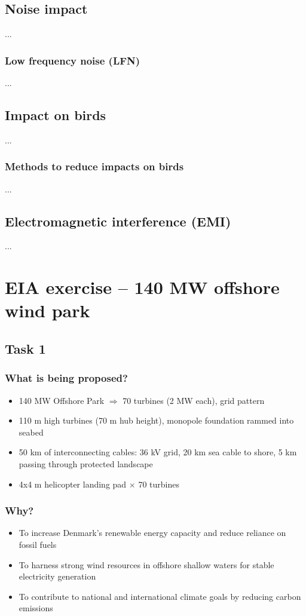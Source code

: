 \documentclass{article}
\begin{document}
\subsection{Noise impact}
...

\subsubsection{Low frequency noise (LFN)}
...

\subsection{Impact on birds}
...

\subsubsection{Methods to reduce impacts on birds}
...

\subsection{Electromagnetic interference (EMI)}
...

\newpage
\section*{EIA exercise -- 140 MW offshore wind park}

\subsection*{Task 1}
\subsubsection*{What is being proposed?}
\begin{itemize}
    \item 140 MW Offshore Park $\Rightarrow$ 70 turbines (2 MW each), grid pattern
    \item 110 m high turbines (70 m hub height), monopole foundation rammed into seabed
    \item 50 km of interconnecting cables: 36 kV grid, 20 km sea cable to shore, 5 km passing through protected landscape
    \item 4x4 m helicopter landing pad $\times$ 70 turbines
\end{itemize}

\subsubsection*{Why?}
\begin{itemize}
    \item To increase Denmark’s renewable energy capacity and reduce reliance on fossil fuels
    \item To harness strong wind resources in offshore shallow waters for stable electricity generation
    \item To contribute to national and international climate goals by reducing carbon emissions
\end{itemize}
\end{document}
